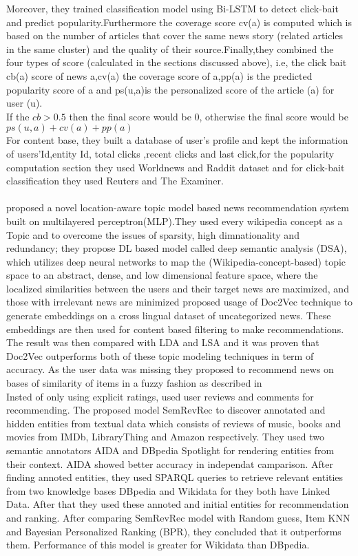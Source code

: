 Moreover, they trained classification model using Bi-LSTM to detect click-bait and predict popularity.Furthermore the coverage score cv(a) is computed which is based on the number of articles that cover the same news story (related articles in the same cluster) and the quality of their source.Finally,they combined the four types of score (calculated in the sections discussed above), i.e, the click bait cb(a) score of news a,cv(a) the coverage score of a,pp(a) is the predicted popularity score of a and ps(u,a)is the personalized score of the article (a) for user (u).
\\If the $cb>0.5$ then the final score would be 0, otherwise the final score would be $ps(u,a)+cv(a)+pp(a)$
\\For content base, they built a database of user's profile and kept the information of users'Id,entity Id, total clicks
,recent clicks and last click,for the popularity computation section they used Worldnews and Raddit dataset and for click-bait classification they used Reuters and The Examiner.
\\
\\\cite{N60} proposed a novel location-aware topic model based news recommendation system built on multilayered perceptron(MLP).They used every wikipedia concept as a Topic and to overcome the issues of sparsity, high dimnationality and redundancy; they propose DL based model called deep semantic analysis (DSA), which utilizes deep neural networks to map the (Wikipedia-concept-based) topic space to an abstract, dense, and low dimensional feature space, where the localized similarities between the users and their target news are maximized, and those with irrelevant news are minimized 
\cite{N12} proposed usage of Doc2Vec technique to generate embeddings on a cross lingual dataset of uncategorized news. These embeddings are then used for content based filtering to make recommendations. The result was then compared with LDA and LSA and it was proven that Doc2Vec outperforms both of these topic modeling techniques in term of accuracy. As the user data was missing they proposed to recommend news on bases of similarity of items in a fuzzy fashion as described in \cite{N12-2}
\\
Insted of only using explicit ratings, \cite{N13} used user reviews and comments for recommending. The proposed model SemRevRec to discover annotated and hidden entities from textual data which consists of reviews of music, books and movies from IMDb, LibraryThing and Amazon respectively. They used two semantic annotators AIDA and DBpedia Spotlight for rendering entities from their context. AIDA showed better accuracy in independat camparison. After finding annoted entities, they used SPARQL queries to retrieve relevant entities from two knowledge bases DBpedia and Wikidata for they both have Linked Data. After that they used these annoted and initial entities for recommendation and ranking. After comparing SemRevRec model with Random guess, Item KNN and Bayesian Personalized Ranking (BPR), they concluded that it outperforms them. Performance of this model is greater for Wikidata than DBpedia.
